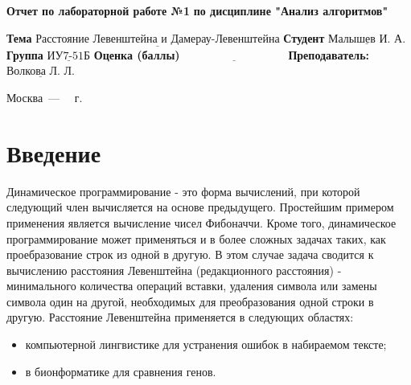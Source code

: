\documentclass{report}
\begin{document}
\begin{titlepage}
	
	\begin{center}
		\noindent\begin{minipage}{1.3\textwidth}\centering
			\Large\textbf{  Отчет по лабораторной работе №1}\newline
			\textbf{по дисциплине "Анализ алгоритмов"}\newline\newline
		\end{minipage}
	\end{center}
	
	\noindent\textbf{Тема} $\underline{\text{Расстояние Левенштейна и Дамерау-Левенштейна}}$\newline\newline
	\noindent\textbf{Студент} $\underline{\text{Малышев И. А.}}$\newline\newline
	\noindent\textbf{Группа} $\underline{\text{ИУ7-51Б}}$\newline\newline
	\noindent\textbf{Оценка (баллы)} $\underline{\text{~~~~~~~~~~~~~~~~~~~~~~~~~~~}}$\newline\newline
	\noindent\textbf{Преподаватель: } $\underline{\text{Волкова Л. Л.}}$\newline\newline\newline
	
	\begin{center}
		\vfill
		Москва~---~\the\year
		~г.
	\end{center}
\end{titlepage}


\tableofcontents
  
\newpage
\chapter*{Введение}


Динамическое программирование - это форма вычислений, при которой следующий член вычисляется на основе предыдущего. Простейшим примером применения является вычисление чисел Фибоначчи. Кроме того, динамическое программирование может применяться и в более сложных задачах таких, как проебразование строк из одной в другую. В этом случае задача сводится к вычислению расстояния Левенштейна (редакционного расстояния) - минимального количества операций вставки, удаления символа или замены символа один на другой, необходимых для преобразования одной строки в другую. Расстояние Левенштейна применяется в следующих областях:
\begin{itemize}
\item компьютерной лингвистике для устранения  ошибок в набираемом тексте;
\item в бионформатике для сравнения генов.
\end{itemize}
\end{document}
